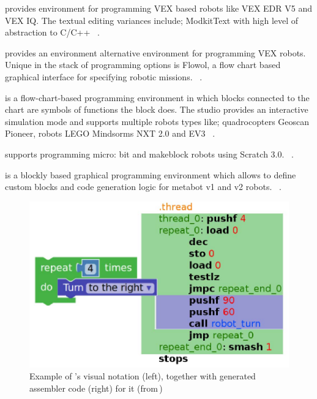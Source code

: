 \parhead{\vex} provides environment for programming VEX based robots like VEX EDR V5 and VEX IQ. 
The textual editing variances include; ModkitText with high level of abstraction to C/C++
~\cite{VexCodingStudio}. %

\parhead{\robotmesh} provides an environment alternative environment for programming VEX robots. Unique in the stack of programming options is Flowol, a flow chart based graphical interface for specifying robotic missions. %
~\cite{RobotMeshStudio}.

\parhead{\trik} is a flow-chart-based programming environment in which blocks connected to the chart are symbols of functions the block does. The studio provides an interactive simulation mode and supports multiple robots types like; quadrocopters Geoscan Pioneer, robots LEGO Mindsorms NXT 2.0 and EV3 ~\cite{STRIKStudio, Mordvinov2017}. 

\parhead{\makeblock} supports programming micro: bit and makeblock robots using Scratch 3.0. %
~\cite{Makeblock}.

\parhead{\metabot} is a blockly based graphical programming environment which allows to define custom blocks and code generation logic for metabot v1 and v2 robots. %
~\cite{Passault2016,Metabot}.

\begin{figure}[t]
     \centering
    \includegraphics[width=.9\columnwidth]{metabotsample.jpg}
      \caption{Example of \metabot's visual notation (left), together with generated assembler code (right) for it (from\,\cite{Passault2016})}
      \label{metabot}
   \end{figure}

